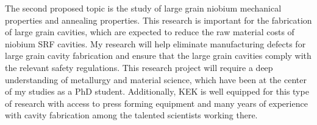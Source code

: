 \documentclass[]{revtex4-2}
\begin{document}
    The second proposed topic is the study of large grain niobium mechanical properties and annealing properties. This research is important for the fabrication of large grain cavities, which are expected to reduce the raw material costs of niobium SRF cavities. My research will help eliminate manufacturing defects for large grain cavity fabrication and ensure that the large grain cavities comply with the relevant safety regulations. This research project will require a deep understanding of metallurgy and material science, which have been at the center of my studies as a PhD student. Additionally, KEK is well equipped for this type of research with access to press forming equipment and many years of experience with cavity fabrication among the talented scientists working there.
    

\newpage



\end{document}
